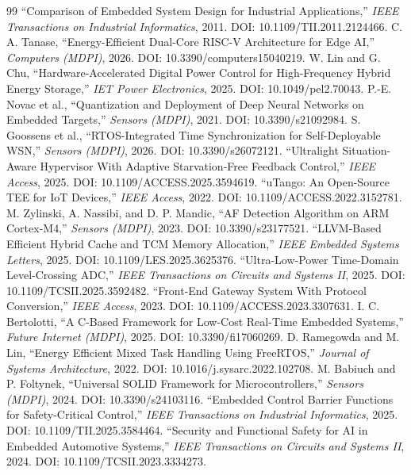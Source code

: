\documentclass[12pt,a4paper]{article}
\begin{document}
\newpage
\begin{thebibliography}{99}
 ``Comparison of Embedded System Design for Industrial Applications,'' \textit{IEEE Transactions on Industrial Informatics}, 2011. DOI: 10.1109/TII.2011.2124466.
 C. A. Tanase, ``Energy-Efficient Dual-Core RISC-V Architecture for Edge AI,'' \textit{Computers (MDPI)}, 2026. DOI: 10.3390/computers15040219.
 W. Lin and G. Chu, ``Hardware-Accelerated Digital Power Control for High-Frequency Hybrid Energy Storage,'' \textit{IET Power Electronics}, 2025. DOI: 10.1049/pel2.70043.
 P.-E. Novac et al., ``Quantization and Deployment of Deep Neural Networks on Embedded Targets,'' \textit{Sensors (MDPI)}, 2021. DOI: 10.3390/s21092984.
 S. Goossens et al., ``RTOS-Integrated Time Synchronization for Self-Deployable WSN,'' \textit{Sensors (MDPI)}, 2026. DOI: 10.3390/s26072121.
 ``Ultralight Situation-Aware Hypervisor With Adaptive Starvation-Free Feedback Control,'' \textit{IEEE Access}, 2025. DOI: 10.1109/ACCESS.2025.3594619.
 ``uTango: An Open-Source TEE for IoT Devices,'' \textit{IEEE Access}, 2022. DOI: 10.1109/ACCESS.2022.3152781.
 M. Zylinski, A. Nassibi, and D. P. Mandic, ``AF Detection Algorithm on ARM Cortex-M4,'' \textit{Sensors (MDPI)}, 2023. DOI: 10.3390/s23177521.
 ``LLVM-Based Efficient Hybrid Cache and TCM Memory Allocation,'' \textit{IEEE Embedded Systems Letters}, 2025. DOI: 10.1109/LES.2025.3625376.
 ``Ultra-Low-Power Time-Domain Level-Crossing ADC,'' \textit{IEEE Transactions on Circuits and Systems II}, 2025. DOI: 10.1109/TCSII.2025.3592482.
 ``Front-End Gateway System With Protocol Conversion,'' \textit{IEEE Access}, 2023. DOI: 10.1109/ACCESS.2023.3307631.
 I. C. Bertolotti, ``A C-Based Framework for Low-Cost Real-Time Embedded Systems,'' \textit{Future Internet (MDPI)}, 2025. DOI: 10.3390/fi17060269.
 D. Ramegowda and M. Lin, ``Energy Efficient Mixed Task Handling Using FreeRTOS,'' \textit{Journal of Systems Architecture}, 2022. DOI: 10.1016/j.sysarc.2022.102708.
 M. Babiuch and P. Foltynek, ``Universal SOLID Framework for Microcontrollers,'' \textit{Sensors (MDPI)}, 2024. DOI: 10.3390/s24103116.
 ``Embedded Control Barrier Functions for Safety-Critical Control,'' \textit{IEEE Transactions on Industrial Informatics}, 2025. DOI: 10.1109/TII.2025.3584464.
 ``Security and Functional Safety for AI in Embedded Automotive Systems,'' \textit{IEEE Transactions on Circuits and Systems II}, 2024. DOI: 10.1109/TCSII.2023.3334273.
\end{thebibliography}
\end{document}
